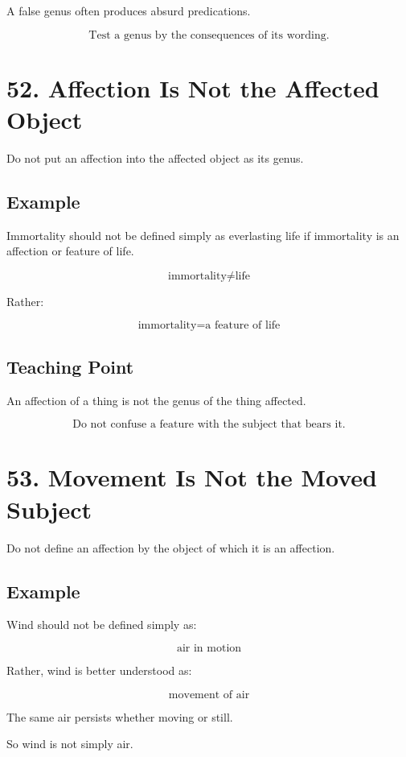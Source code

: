 \documentclass[12pt]{article}
\begin{document}
A false genus often produces absurd predications.

\[
\boxed{
\text{Test a genus by the consequences of its wording.}
}
\]

\section*{52. Affection Is Not the Affected Object}

Do not put an affection into the affected object as its genus.

\subsection*{Example}

Immortality should not be defined simply as everlasting life if immortality is
an affection or feature of life.

\[
\text{immortality} \neq \text{life}
\]

Rather:

\[
\text{immortality} = \text{a feature of life}
\]

\subsection*{Teaching Point}

An affection of a thing is not the genus of the thing affected.

\[
\boxed{
\text{Do not confuse a feature with the subject that bears it.}
}
\]

\section*{53. Movement Is Not the Moved Subject}

Do not define an affection by the object of which it is an affection.

\subsection*{Example}

Wind should not be defined simply as:

\[
\text{air in motion}
\]

Rather, wind is better understood as:

\[
\text{movement of air}
\]

The same air persists whether moving or still.

So wind is not simply air.
\end{document}
